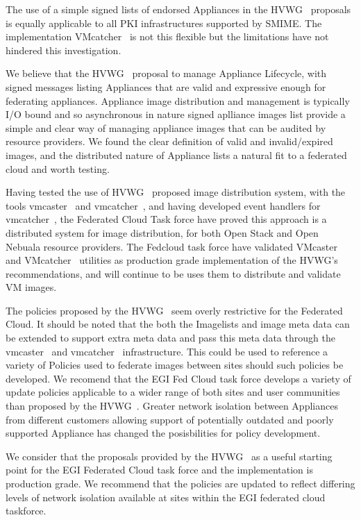 \documentclass{llncs_Ibergrid2013}
\begin{document}
The use of a simple signed lists of endorsed Appliances in the HVWG~\cite{hepix} proposals is equally applicable to all PKI infrastructures supported by SMIME. The implementation VMcatcher~\cite{vmcatcher} is not this flexible but the limitations have not hindered this investigation.

We believe that the HVWG~\cite{hepix} proposal to manage Appliance Lifecycle, with signed messages listing Appliances that are valid and expressive enough for federating appliances. Appliance image distribution and management is typically I/O bound and so asynchronous in nature signed aplliance images list provide a simple and clear way of managing appliance images that can be audited by resource providers. We found the clear definition of valid and invalid/expired images, and the distributed nature of Appliance lists a natural fit to a federated cloud and worth testing.

Having tested the use of HVWG~\cite{hepix} proposed image distribution system, with the tools vmcaster~\cite{vmcaster} and vmcatcher~\cite{vmcatcher}, and having developed event handlers for vmcatcher~\cite{vmcatcher}, the Federated Cloud Task force have proved this approach is a distributed system for image distribution, for both Open Stack and Open Nebuala resource providers. The Fedcloud task force have validated VMcaster~\cite{vmcaster} and VMcatcher~\cite{vmcatcher} utilities as production grade implementation of the HVWG's~\cite{hepix} recommendations, and will continue to be uses them to distribute and validate VM images.

The policies proposed by the HVWG~\cite{hepix} seem overly restrictive for the Federated Cloud. It should be noted that the both the Imagelists and image meta data can be extended to support extra meta data and pass this meta data through the vmcaster~\cite{vmcaster} and vmcatcher~\cite{vmcatcher} infrastructure. This could be used to reference a variety of Policies used to federate images between sites should such policies be developed. We recomend that the EGI Fed Cloud task force develops a variety of update policies applicable to a wider range of both sites and user communities than proposed by the HVWG~\cite{hepix}. Greater network isolation between Appliances from different customers allowing support of potentially outdated and poorly supported Appliance has changed the posisbilities for policy development.

We consider that the proposals provided by the HVWG~\cite{hepix} as a useful starting point for the EGI Federated Cloud task force and the implementation is production grade. We recommend that the policies are updated to reflect differing levels of network isolation available at sites within the EGI federated cloud taskforce.
\end{document}
